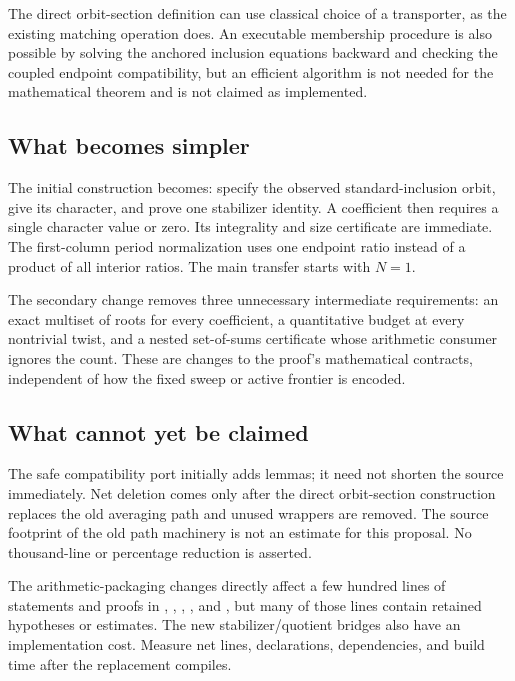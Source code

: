 The direct orbit-section definition can use classical choice of a transporter, as the existing matching operation does. An executable membership procedure is also possible by solving the anchored inclusion equations backward and checking the coupled endpoint compatibility, but an efficient algorithm is not needed for the mathematical theorem and is not claimed as implemented.

\subsection{What becomes simpler}

The initial construction becomes: specify the observed standard-inclusion orbit, give its character, and prove one stabilizer identity. A coefficient then requires a single character value or zero. Its integrality and size certificate are immediate. The first-column period normalization uses one endpoint ratio instead of a product of all interior ratios. The main transfer starts with $N=1$.

The secondary change removes three unnecessary intermediate requirements: an exact multiset of roots for every coefficient, a quantitative budget at every nontrivial twist, and a nested set-of-sums certificate whose arithmetic consumer ignores the count. These are changes to the proof's mathematical contracts, independent of how the fixed sweep or active frontier is encoded.

\subsection{What cannot yet be claimed}

The safe compatibility port initially adds lemmas; it need not shorten the source immediately. Net deletion comes only after the direct orbit-section construction replaces the old averaging path and unused wrappers are removed. The source footprint of the old path machinery is not an estimate for this proposal. No thousand-line or percentage reduction is asserted.

The arithmetic-packaging changes directly affect a few hundred lines of statements and proofs in , , , , and , but many of those lines contain retained hypotheses or estimates. The new stabilizer/quotient bridges also have an implementation cost. Measure net lines, declarations, dependencies, and build time after the replacement compiles.

